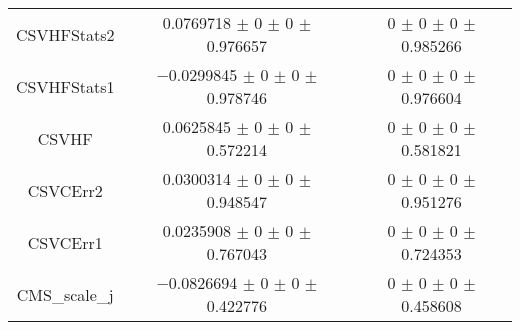 \begin{table}
\begin{tabular}{ccc}
CSVHFStats2 	& \num{0.0769718} $\pm$ \num{0} $\pm$ \num{0} $\pm$ \num{0.976657} 	& \num{0} $\pm$ \num{0} $\pm$ \num{0} $\pm$ \num{0.985266}\\
CSVHFStats1 	& \num{-0.0299845} $\pm$ \num{0} $\pm$ \num{0} $\pm$ \num{0.978746} 	& \num{0} $\pm$ \num{0} $\pm$ \num{0} $\pm$ \num{0.976604}\\
CSVHF 	& \num{0.0625845} $\pm$ \num{0} $\pm$ \num{0} $\pm$ \num{0.572214} 	& \num{0} $\pm$ \num{0} $\pm$ \num{0} $\pm$ \num{0.581821}\\
CSVCErr2 	& \num{0.0300314} $\pm$ \num{0} $\pm$ \num{0} $\pm$ \num{0.948547} 	& \num{0} $\pm$ \num{0} $\pm$ \num{0} $\pm$ \num{0.951276}\\
CSVCErr1 	& \num{0.0235908} $\pm$ \num{0} $\pm$ \num{0} $\pm$ \num{0.767043} 	& \num{0} $\pm$ \num{0} $\pm$ \num{0} $\pm$ \num{0.724353}\\
CMS\_scale\_j 	& \num{-0.0826694} $\pm$ \num{0} $\pm$ \num{0} $\pm$ \num{0.422776} 	& \num{0} $\pm$ \num{0} $\pm$ \num{0} $\pm$ \num{0.458608}\\
\bottomrule
\end{tabular}
\end{table}